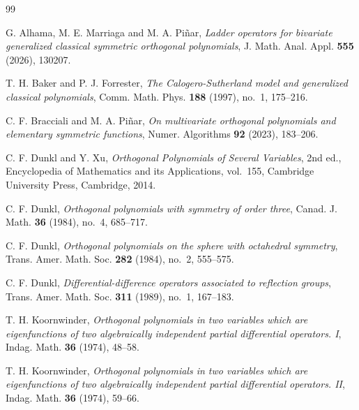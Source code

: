 \documentclass[reqno,10pt]{amsart}
\theoremstyle{plain}
\numberwithin{equation}{section}
\numberwithin{figure}{section}
\begin{document}
\begin{thebibliography}{99}

G. Alhama, M. E. Marriaga and M. A. Pi\~nar,
\textit{Ladder operators for bivariate generalized classical symmetric orthogonal polynomials},
J. Math. Anal. Appl. \textbf{555} (2026), 130207.

T. H. Baker and P. J. Forrester,
\textit{The Calogero-Sutherland model and generalized classical polynomials},
Comm. Math. Phys. \textbf{188} (1997), no.~1, 175--216.


C. F. Bracciali and M. A. Pi\~nar,
\textit{On multivariate orthogonal polynomials and elementary symmetric functions},
Numer. Algorithms \textbf{92} (2023), 183--206.



C. F. Dunkl and Y. Xu,
\textit{Orthogonal Polynomials of Several Variables},
2nd ed., Encyclopedia of Mathematics and its Applications, vol.~155,
Cambridge University Press, Cambridge, 2014.

C. F. Dunkl,
\textit{Orthogonal polynomials with symmetry of order three},
Canad. J. Math. \textbf{36} (1984), no.~4, 685--717.

C. F. Dunkl,
\textit{Orthogonal polynomials on the sphere with octahedral symmetry},
Trans. Amer. Math. Soc. \textbf{282} (1984), no.~2, 555--575.

C. F. Dunkl,
\textit{Differential-difference operators associated to reflection groups},
Trans. Amer. Math. Soc. \textbf{311} (1989), no.~1, 167--183.



T. H. Koornwinder,
\textit{Orthogonal polynomials in two variables which are eigenfunctions of two algebraically independent partial differential operators. I},
Indag. Math. \textbf{36} (1974), 48--58.

T. H. Koornwinder,
\textit{Orthogonal polynomials in two variables which are eigenfunctions of two algebraically independent partial differential operators. II},
Indag. Math. \textbf{36} (1974), 59--66.


\end{thebibliography}
\end{document}
